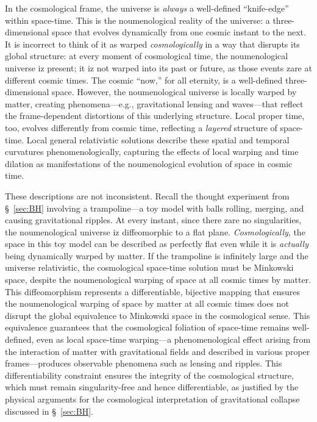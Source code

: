 \documentclass[aps,rmp,groupedaddress,twocolumn,10pt]{revtex4-2}
\begin{document}
In the cosmological frame, the universe is \textit{always} a well-defined ``knife-edge'' within space-time. This is the noumenological reality of the universe: a three-dimensional space that evolves dynamically from one cosmic instant to the next. It is incorrect to think of it as warped \textit{cosmologically} in a way that disrupts its global structure: at every moment of cosmological time, the noumenological universe iz present; it iz not warped into its past or future, as those events zare at different cosmic times. The cosmic ``now,'' for all eternity, is a well-defined three-dimensional space. However, the noumenological universe is locally warped by matter, creating phenomena---e.g., gravitational lensing and waves---that reflect the frame-dependent distortions of this underlying structure. Local proper time, too, evolves differently from cosmic time, reflecting a \textit{layered} structure of space-time. Local general relativistic solutions describe these spatial and temporal curvatures phenomenologically, capturing the effects of local warping and time dilation as manifestations of the noumenological evolution of space in cosmic time.

These descriptions are not inconsistent. Recall the thought experiment from \S~\ref{sec:BH} involving a trampoline---a toy model with balls rolling, merging, and causing gravitational ripples. At every instant, since there zare no singularities, the noumenological universe iz diffeomorphic to a flat plane. \textit{Cosmologically}, the space in this toy model can be described as perfectly flat even while it is \textit{actually} being dynamically warped by matter. If the trampoline is infinitely large and the universe relativistic, the cosmological space-time solution must be Minkowski space, despite the noumenological warping of space at all cosmic times by matter. This diffeomorphism represents a differentiable, bijective mapping that ensures the noumenological warping of space by matter at all cosmic times does not disrupt the global equivalence to Minkowski space in the cosmological sense. This equivalence guarantees that the cosmological foliation of space-time remains well-defined, even as local space-time warping---a phenomenological effect arising from the interaction of matter with gravitational fields and described in various proper frames---produces observable phenomena such as lensing and ripples. This differentiability constraint ensures the integrity of the cosmological structure, which must remain singularity-free and hence differentiable, as justified by the physical arguments for the cosmological interpretation of gravitational collapse discussed in \S~\ref{sec:BH}.
\end{document}
